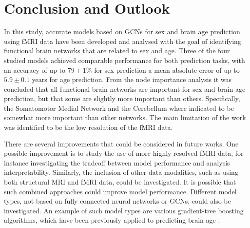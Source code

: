 

\chapter{Conclusion and Outlook}

In this study, accurate models based on GCNs for sex and brain age prediction using fMRI data have been developed and analysed with the goal of identifying functional brain networks that are related to sex and age. Three of the four studied models achieved comparable performance for both prediction tasks, with an accuracy of up to $79\pm1\%$ for sex prediction a mean absolute error of up to $5.9\pm0.1$ years for age prediction. From the node importance analysis it was concluded that all functional brain networks are important for sex and brain age prediction, but that some are slightly more important than others. Specifically, the Somatomotor Medial Network and the Cerebellum where indicated to be somewhat more important than other networks. The main limitation of the work was identified to be the low resolution of the fMRI data.

There are several improvements that could be considered in future works. One possible improvement is to study the use of more highly resolved fMRI data, for instance investigating the tradeoff between model performance and analysis interpretability. Similarly, the inclusion of other data modalities, such as using both structural MRI and fMRI data, could be investigated. It is possible that such combined approaches could improve model performance. Different model types, not based on fully connected neural networks or GCNs, could also be investigated. An example of such model types are various gradient-tree boosting algorithms, which have been previously applied to predicting brain age \cite{kaufmann}.

